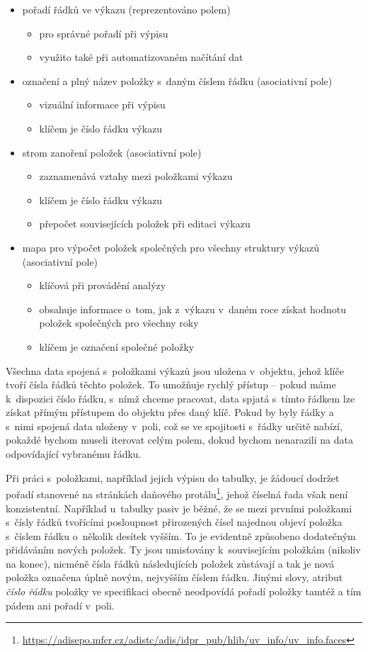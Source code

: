 \begin{itemize}
\item pořadí řádků ve výkazu (reprezentováno polem)
  \begin{itemize}
    \item pro správné pořadí při výpisu
    \item využito také při automatizovaném načítání dat
  \end{itemize}
\item označení a plný název položky s~daným číslem řádku (asociativní pole)
  \begin{itemize}
    \item vizuální informace při výpisu
    \item klíčem je číslo řádku výkazu
  \end{itemize}
\item strom zanoření položek (asociativní pole)
  \begin{itemize}
    \item zaznamenává vztahy mezi položkami výkazu
    \item klíčem je číslo řádku výkazu
    \item přepočet souvisejících položek při editaci výkazu
  \end{itemize}
\item mapa pro výpočet položek společných pro všechny struktury výkazů (asociativní pole)
  \begin{itemize}
    \item klíčová při provádění analýzy
    \item obsahuje informace o~tom, jak z~výkazu v~daném roce získat hodnotu položek společných pro všechny roky
    \item klíčem je označení společné položky
  \end{itemize}
\end{itemize} 


Všechna data spojená s~položkami výkazů jsou uložena v~objektu, jehož klíče tvoří čísla řádků těchto položek. To umožňuje rychlý přístup -- pokud máme k~dispozici číslo řádku, s~nímž chceme pracovat, data spjatá s~tímto řádkem lze získat přímým přístupem do objektu přes daný klíč. Pokud by byly řádky a s~nimi spojená data uloženy v~poli, což se ve spojitosti s~řádky určitě nabízí, pokaždé bychom museli iterovat celým polem, dokud bychom nenarazili na data odpovídající vybranému řádku.

Při práci s~položkami, například jejich výpisu do tabulky, je žádoucí dodržet pořadí stanovené na stránkách daňového protálu\footnote{\url{https://adisepo.mfcr.cz/adistc/adis/idpr_pub/hlib/uv_info/uv_info.faces}}, jehož číselná řada však není konzistentní. Například u~tabulky pasiv je běžné, že se mezi prvními položkami s~čísly řádků tvořícími posloupnost přirozených čísel najednou objeví položka s~číslem řádku o~několik desítek vyšším. To je evidentně způsobeno dodatečným přidáváním nových položek. Ty jsou umisťovány k~souvisejícím položkám (nikoliv na konec), nicméně čísla řádků následujících položek zůstávají a tak je nová položka označena úplně novým, nejvyšším číslem řádku. Jinými slovy, atribut \textit{číslo řádku} položky ve specifikaci obecně neodpovídá pořadí položky tamtéž a tím pádem ani pořadí v~poli.

